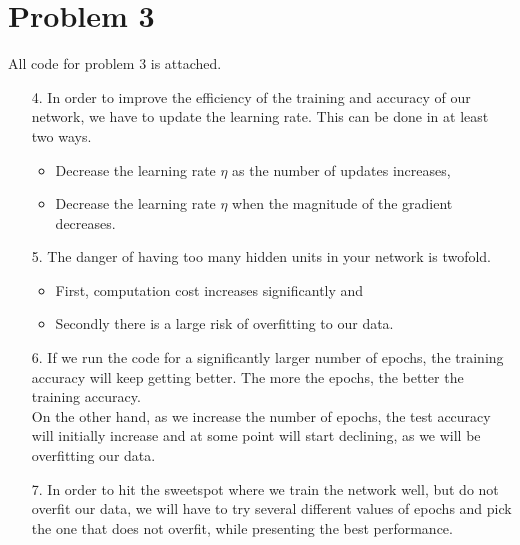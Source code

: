 \documentclass[letterpaper, 12pt]{article}
\begin{document}
\section* {Problem 3}
All code for problem 3 is attached.
\begin{enumerate} 
    \item[4.] In order to improve the efficiency of the training and accuracy of our network, we have to update the learning rate. This can be done in at least two ways.
    \begin{itemize}
        \item Decrease the learning rate $\eta$ as the number of updates increases,
        \item Decrease the learning rate $\eta$ when the magnitude of the gradient decreases.
    \end{itemize} 
    \item [5.] The danger of having too many hidden units in your network is twofold.
    \begin{itemize}
        \item First, computation cost increases significantly and
        \item Secondly there is a large risk of overfitting to our data.
    \end{itemize}
    \item [6.] If we run the code for a significantly larger number of epochs, the training accuracy will keep getting better. The more the epochs, the better the training accuracy. \\
    On the other hand, as we increase the number of epochs, the test accuracy will initially increase and at some point will start declining, as we will be overfitting our data.
    \item[7.] In order to hit the sweetspot where we train the network well, but do not overfit our data, we will have to try several different values of epochs and pick the one that does not overfit, while presenting the best performance.
\end{enumerate}
\vspace{3mm}
\end{document}
